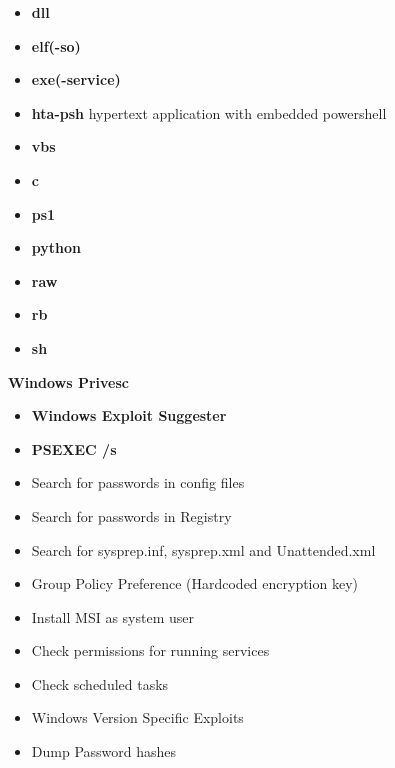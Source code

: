 \documentclass[a4paper,10pt]{article}
\begin{document}
\begin{multicols}{2}
\begin{tcolorbox}[breakable,title=Payload Generation]
\begin{itemize}
	\item \textbf{dll}
	\item \textbf{elf(-so)}
	\item \textbf{exe(-service)}
	\item \textbf{hta-psh} hypertext application with embedded powershell
	\item \textbf{vbs}
	\item \textbf{c}
	\item \textbf{ps1}
	\item \textbf{python}
	\item \textbf{raw}
	\item \textbf{rb}
	\item \textbf{sh}
\end{itemize}
\end{tcolorbox}
\end{multicols}
\newpage
\Huge{\textbf{Windows Privesc}}
\newline
\normalsize
\begin{tcolorbox}[breakable,title=Generic]
\begin{itemize}
	\itemsep0em
	\item \textbf{Windows Exploit Suggester}
	\item \textbf{PSEXEC /s}
	\item Search for passwords in config files
	\item Search for passwords in Registry
	\item Search for sysprep.inf, sysprep.xml and Unattended.xml
	\item Group Policy Preference (Hardcoded encryption key)
	\item Install MSI as system user
	\item Check permissions for running services
	\item Check scheduled tasks
	\item Windows Version Specific Exploits
	\item Dump Password hashes
\end{itemize}
\end{tcolorbox}
\end{document}
